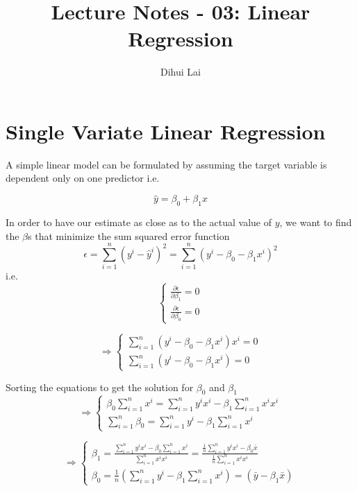 \documentclass[12pt, oneside]{article}
\title{Lecture Notes - 03: Linear Regression}
\author{Dihui Lai}
\begin{document}
\maketitle
\tableofcontents

\vspace{.25in}

\section{Single Variate Linear Regression}
A simple linear model can be formulated by assuming the target variable is dependent only on one predictor i.e.

$$\hat{y}=\beta_0+\beta_1 x$$

In order to have our estimate as close as to the actual value of $y$, we want to find the $\beta$s that minimize the sum squared error function
\begin{equation}
\epsilon=\sum_{i=1}^n(y^i-\hat{y}^i)^2=\sum_{i=1}^n(y^i-\beta_0-\beta_1 x^i)^2
\end{equation}
i.e.
\begin{equation}
\begin{cases}
\frac{\partial \epsilon}{\partial {\beta}_1}=0\\
\frac{\partial \epsilon}{\partial {\beta}_0}=0

\end{cases}
\end{equation}

\begin{equation}
\Rightarrow
\begin{cases}
\sum\limits_{i=1}^{n}(y^{i}-{\beta_0}-{\beta_1} x^{i})x^{i}=0\\
\sum\limits_{i=1}^{n}(y^{i}-{\beta_0}-{\beta_1} x^{i})=0
\end{cases}
\end{equation}

Sorting the equations to get the solution for $\beta_0$ and $\beta_1$
\begin{equation*}
\Rightarrow
\begin{cases}
{\beta_0}\sum\limits_{i=1}^{n}x^{i}=\sum\limits_{i=1}^{n}y^{i}x^{i}-{\beta_1}\sum\limits_{i=1}^{n} x^{i}x^{i}\\
\sum\limits_{i=1}^{n}{\beta_0}=\sum\limits_{i=1}^{n}y^{i}-{\beta_1}\sum\limits_{i=1}^{n} x^{i}
\end{cases}
\end{equation*}

\begin{equation}
\Rightarrow
\begin{cases}
{\beta_1}=\frac{\sum\limits_{i=1}^{n}y^{i}x^{i}-{\beta_0}\sum\limits_{i=1}^{n}x^{i}}{\sum\limits_{i=1}^{n}x^{i}x^{i}}=\frac{\frac{1}{n}\sum\limits_{i=1}^{n}y^{i}x^{i}-{\beta_0}\bar{x}}{\frac{1}{n}\sum\limits_{i=1}^{n}x^{i}x^{i}}\\
{\beta_0}=\frac{1}{n}(\sum\limits_{i=1}^{n}y^{i}-{\beta_1}\sum\limits_{i=1}^{n} x^{i})=(\bar{y}-\beta_1\bar{x})
\end{cases}
\end{equation}
\end{document}
